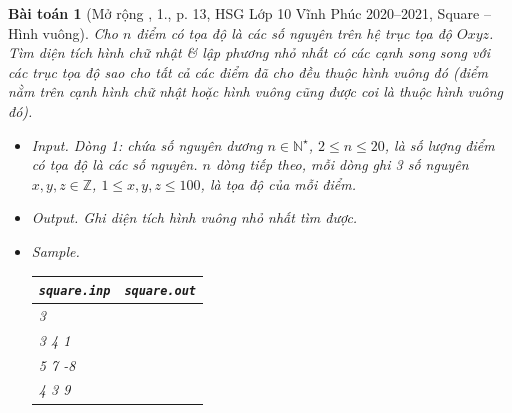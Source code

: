 \documentclass{article}
\newtheorem{baitoan}{Bài toán}
\begin{document}
\begin{baitoan}[Mở rộng \cite{Trung_HSG_THPT_Tin}, 1., p. 13, HSG Lớp 10 Vĩnh Phúc 2020--2021, Square -- Hình vuông]
	Cho $n$ điểm có tọa độ là các số nguyên trên hệ trục tọa độ $Oxyz$. Tìm diện tích hình chữ nhật \& lập phương nhỏ nhất có các cạnh song song với các trục tọa độ sao cho tất cả các điểm đã cho đều thuộc hình vuông đó (điểm nằm trên cạnh hình chữ nhật hoặc hình vuông cũng được coi là thuộc hình vuông đó).
	\begin{itemize}
		\item {\sf Input.} Dòng 1: chứa số nguyên dương $n\in\mathbb{N}^\star$, $2\le n\le20$, là số lượng điểm có tọa độ là các số nguyên. $n$ dòng tiếp theo, mỗi dòng ghi 3 số nguyên $x,y,z\in\mathbb{Z}$, $1\le x,y,z\le100$, là tọa độ của mỗi điểm.
		\item {\sf Output.} Ghi diện tích hình vuông nhỏ nhất tìm được.
		\item {\sf Sample.}
		\begin{table}[H]
			\centering
			\begin{tabular}{|l|l|}
				\hline
				{\tt square.inp} & {\tt square.out} \\
				\hline
				3 &  \\
				3 4 1 &  \\
				5 7 -8 &  \\
				4 3 9 &  \\
				\hline
			\end{tabular}
		\end{table}
	\end{itemize}
\end{baitoan}
\end{document}
